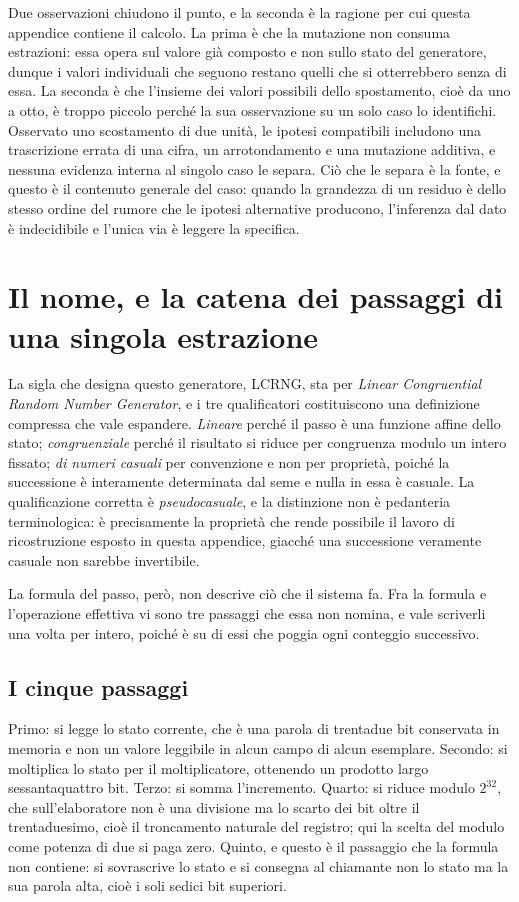 Due osservazioni chiudono il punto, e la seconda è la ragione per cui questa appendice contiene il calcolo. La prima è che la mutazione non consuma estrazioni: essa opera sul valore già composto e non sullo stato del generatore, dunque i valori individuali che seguono restano quelli che si otterrebbero senza di essa. La seconda è che l'insieme dei valori possibili dello spostamento, cioè da uno a otto, è troppo piccolo perché la sua osservazione su un solo caso lo identifichi. Osservato uno scostamento di due unità, le ipotesi compatibili includono una trascrizione errata di una cifra, un arrotondamento e una mutazione additiva, e nessuna evidenza interna al singolo caso le separa. Ciò che le separa è la fonte, e questo è il contenuto generale del caso: quando la grandezza di un residuo è dello stesso ordine del rumore che le ipotesi alternative producono, l'inferenza dal dato è indecidibile e l'unica via è leggere la specifica.
\section{Il nome, e la catena dei passaggi di una singola estrazione}

La sigla che designa questo generatore, LCRNG, sta per \emph{Linear Congruential Random Number Generator}, e i tre qualificatori costituiscono una definizione compressa che vale espandere. \emph{Lineare} perché il passo è una funzione affine dello stato; \emph{congruenziale} perché il risultato si riduce per congruenza modulo un intero fissato; \emph{di numeri casuali} per convenzione e non per proprietà, poiché la successione è interamente determinata dal seme e nulla in essa è casuale. La qualificazione corretta è \emph{pseudocasuale}, e la distinzione non è pedanteria terminologica: è precisamente la proprietà che rende possibile il lavoro di ricostruzione esposto in questa appendice, giacché una successione veramente casuale non sarebbe invertibile.

La formula del passo, però, non descrive ciò che il sistema fa. Fra la formula e l'operazione effettiva vi sono tre passaggi che essa non nomina, e vale scriverli una volta per intero, poiché è su di essi che poggia ogni conteggio successivo.

\subsection*{I cinque passaggi}

Primo: si legge lo stato corrente, che è una parola di trentadue bit conservata in memoria e non un valore leggibile in alcun campo di alcun esemplare. Secondo: si moltiplica lo stato per il moltiplicatore, ottenendo un prodotto largo sessantaquattro bit. Terzo: si somma l'incremento. Quarto: si riduce modulo $2^{32}$, che sull'elaboratore non è una divisione ma lo scarto dei bit oltre il trentaduesimo, cioè il troncamento naturale del registro; qui la scelta del modulo come potenza di due si paga zero. Quinto, e questo è il passaggio che la formula non contiene: si sovrascrive lo stato e si consegna al chiamante non lo stato ma la sua parola alta, cioè i soli sedici bit superiori.

